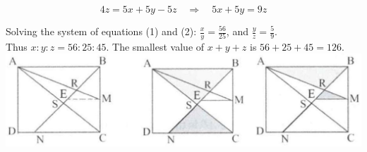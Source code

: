 \documentclass{article}
\begin{document}
\[
4 z=5 x+5 y-5 z \quad \Rightarrow \quad 5 x+5 y=9 z
\]

Solving the system of equations (1) and (2): \(\frac{x}{y}=\frac{56}{25}\), and \(\frac{y}{z}=\frac{5}{9}\).\\
Thus \(x: y: z=56: 25: 45\). The smallest value of \(x+y+z\) is \(56+25+45=126\).\\
\centering
\includegraphics[width=\textwidth]{images/reasoning_image_1.jpg}
\end{document}
